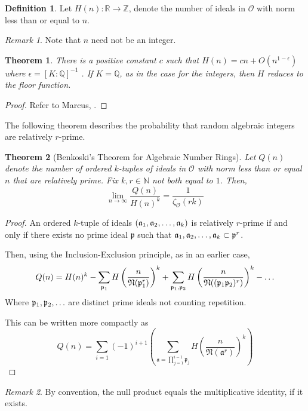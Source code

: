 \documentclass[10pt,a4paper]{article}
\newtheorem{theorem}{Theorem}[section]
\theoremstyle{definition}
\newtheorem{definition}{Definition}[section]
\theoremstyle{remark}
\newtheorem{remark}{Remark}
\newcommand{\f}[1]{\mathfrak{#1}}
\begin{document}
	\begin{definition} \label{H}
		Let \(H(n):\mathbb{R} \to \mathbb{Z}\), denote the number of ideals in \(\mathcal{O}\) with norm less than or equal to \(n\).
	\end{definition}

	\begin{remark}
		Note that \(n\) need not be an integer.
	\end{remark}
	
	\begin{theorem} There is a positive constant \(c\) such that \(H(n)=cn+O(n^{1-\epsilon})\) where \(\epsilon = [K : \mathbb{Q}]^{-1}\) \label{H-estimate}. If \(K=\mathbb{Q}\), as in the case for the integers, then \(H\) reduces to the floor function.
	\end{theorem}
	\begin{proof}
	    Refer to Marcus, \cite{marcus_number_2012}.
	\end{proof}
	
	The following theorem describes the probability that random algebraic integers are relatively \(r\)-prime.
	\begin{theorem}[Benkoski's Theorem for Algebraic Number Rings]
		Let \(Q(n)\) denote the number of ordered \(k\)-tuples of ideals in \(\mathcal{O}\) with norm less than or equal \(n\) that are relatively prime.
		Fix \(k,r\in\mathbb{N}\) not both equal to \(1\). Then, \[\lim\limits_{n\to\infty}\frac{Q(n)}{H(n)^k}=\frac{1}{\zeta_\mathcal{O}(rk)}\]
	\end{theorem}

	\begin{proof}
		 An ordered \(k\)-tuple of ideals \((\f{a}_1, \f{a}_2, \mathellipsis, \f{a}_k)\) is relatively \(r\)-prime if and only if there exists no prime ideal \(\f{p}\) such that \(\f{a}_1, \f{a}_2,\mathellipsis,\f{a}_k\subset \f{p}^r\).
		
		Then, using the Inclusion-Exclusion principle, as in an earlier case,
		\begin{equation}
			Q(n) = H(n)^k - \sum_{\f{p}_1}H\left(\frac{n}{\f{N}(\f{p}_1^r)}\right)^k+\sum_{\f{p}_1,\f{p}_2}H\left(\frac{n}{\f{N}((\f{p}_1\f{p}_2)^r)}\right)^k-\mathellipsis
		\end{equation}
	Where \(\f{p}_1,\f{p}_2,\mathellipsis\) are distinct prime ideals not counting repetition. 
	
	This can be written more compactly as  
	\begin{equation}
		Q(n)=\sum_{i=1}(-1)^{i+1}\left(\sum_{\f{a}= \prod_{j=1}^{i-1}\f{p}_j}H\left(\frac{n}{\f{N}(\f{a}^r)}\right)^k\right)
	\end{equation}
	\end{proof}
	\begin{remark}
		By convention, the null product equals the multiplicative identity, if it exists. 
	\end{remark}
\end{document}
